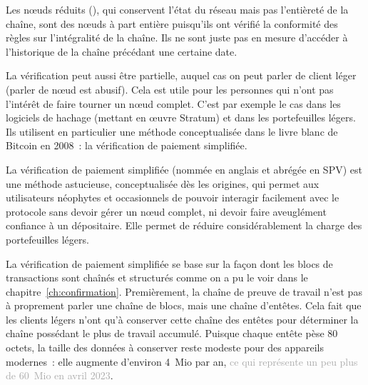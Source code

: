 Les nœuds réduits (), qui conservent l'état du réseau mais pas l'entièreté de la chaîne, sont des nœuds à part entière puisqu'ils ont vérifié la conformité des règles sur l'intégralité de la chaîne. Ils ne sont juste pas en mesure d'accéder à l'historique de la chaîne précédant une certaine date.

La vérification peut aussi être partielle, auquel cas on peut parler de client léger (parler de nœud est abusif). Cela est utile pour les personnes qui n'ont pas l'intérêt de faire tourner un nœud complet. C'est par exemple le cas dans les logiciels de hachage (mettant en œuvre Stratum) et dans les portefeuilles légers. Ils utilisent en particulier une méthode conceptualisée dans le livre blanc de Bitcoin en 2008~: la vérification de paiement simplifiée.

La vérification de paiement simplifiée (nommée en anglais  et abrégée en SPV) est une méthode astucieuse, conceptualisée dès les origines, qui permet aux utilisateurs néophytes et occasionnels de pouvoir interagir facilement avec le protocole sans devoir gérer un nœud complet, ni devoir faire aveuglément confiance à un dépositaire. Elle permet de réduire considérablement la charge des portefeuilles légers.  %

La vérification de paiement simplifiée se base sur la façon dont les blocs de transactions sont chaînés et structurés comme on a pu le voir dans le chapitre~\ref{ch:confirmation}. Premièrement, la chaîne de preuve de travail n'est pas à proprement parler une chaîne de blocs, mais une chaîne d'entêtes. Cela fait que les clients légers n'ont qu'à conserver cette chaîne des entêtes pour déterminer la chaîne possédant le plus de travail accumulé. Puisque chaque entête pèse 80 octets, la taille des données à conserver reste modeste pour des appareils modernes~: elle augmente d'environ 4~Mio par an, \textcolor{darkgray}{ce qui représente un peu plus de 60~Mio en avril 2023}.


